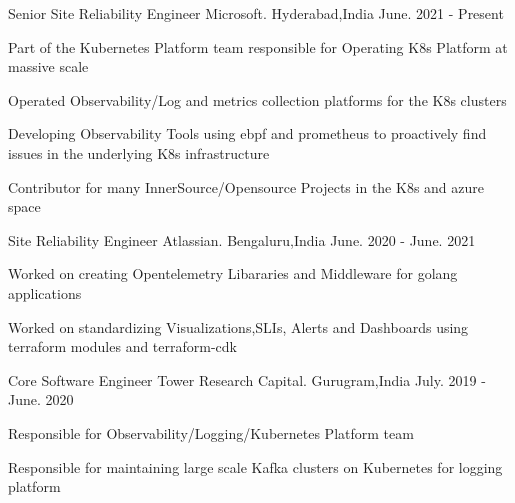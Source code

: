 

\begin{cventries}

    \cventry
    {Senior Site Reliability Engineer} %
    {Microsoft.} %
    {Hyderabad,India} %
    {June. 2021 - Present} %
    {
      \begin{cvitems} %
         \item { Part of the  Kubernetes Platform team responsible for Operating K8s Platform at massive scale }
	       \item { Operated Observability/Log and metrics collection platforms for the K8s clusters }
	       \item { Developing Observability Tools using ebpf and prometheus to proactively find issues in the underlying K8s infrastructure}
         \item { Contributor for many InnerSource/Opensource Projects in the K8s and azure space } 		
	  \end{cvitems}
    }
    \cventry
    {Site Reliability Engineer} %
    {Atlassian.} %
    {Bengaluru,India} %
    {June. 2020 - June. 2021} %
    {
      \begin{cvitems} %
               \item { Worked on creating Opentelemetry Libararies and Middleware for golang applications }
               \item { Worked on standardizing Visualizations,SLIs, Alerts and Dashboards using terraform modules and terraform-cdk} 		
	  \end{cvitems}
    }
    \cventry
    {Core Software Engineer} %
    {Tower Research Capital.} %
    {Gurugram,India} %
    {July. 2019 - June. 2020} %
    {
      \begin{cvitems} %
	             \item { Responsible for Observability/Logging/Kubernetes Platform team }
               \item { Responsible for maintaining large scale Kafka clusters on Kubernetes for logging platform}

\end{cvitems}}
\end{cventries}
